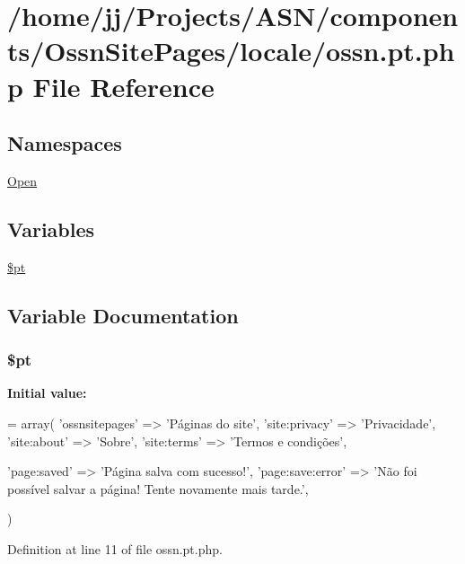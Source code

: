\hypertarget{components_2_ossn_site_pages_2locale_2ossn_8pt_8php}{}\section{/home/jj/\+Projects/\+A\+S\+N/components/\+Ossn\+Site\+Pages/locale/ossn.pt.\+php File Reference}
\label{components_2_ossn_site_pages_2locale_2ossn_8pt_8php}
\subsection*{Namespaces}
\begin{DoxyCompactItemize}
\item 
 \hyperlink{namespace_open}{Open}
\end{DoxyCompactItemize}
\subsection*{Variables}
\begin{DoxyCompactItemize}
\item 
\hyperlink{components_2_ossn_site_pages_2locale_2ossn_8pt_8php_a62c150775a7a00e8663463c638016cad}{\$pt}
\end{DoxyCompactItemize}


\subsection{Variable Documentation}
\subsubsection[{\texorpdfstring{\$pt}{$pt}}]{\setlength{\rightskip}{0pt plus 5cm}\$pt}\hypertarget{components_2_ossn_site_pages_2locale_2ossn_8pt_8php_a62c150775a7a00e8663463c638016cad}{}\label{components_2_ossn_site_pages_2locale_2ossn_8pt_8php_a62c150775a7a00e8663463c638016cad}
{\bfseries Initial value\+:}
\begin{DoxyCode}
= array(
    \textcolor{stringliteral}{'ossnsitepages'} => \textcolor{stringliteral}{'Páginas do site'},
    \textcolor{stringliteral}{'site:privacy'} => \textcolor{stringliteral}{'Privacidade'},
    \textcolor{stringliteral}{'site:about'} => \textcolor{stringliteral}{'Sobre'},
    \textcolor{stringliteral}{'site:terms'} => \textcolor{stringliteral}{'Termos e condições'},

    \textcolor{stringliteral}{'page:saved'} => \textcolor{stringliteral}{'Página salva com sucesso!'},
    \textcolor{stringliteral}{'page:save:error'} => \textcolor{stringliteral}{'Não foi possível salvar a página! Tente novamente mais tarde.'},

)
\end{DoxyCode}


Definition at line 11 of file ossn.\+pt.\+php.

